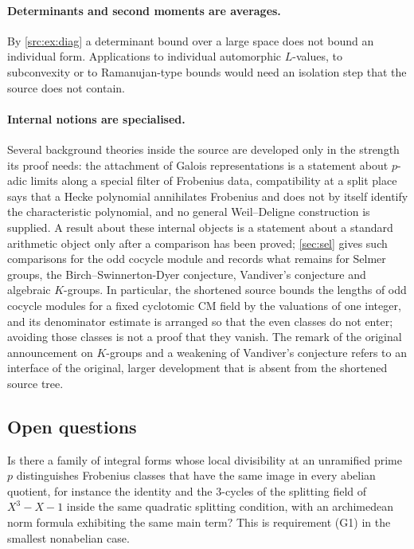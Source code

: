 \paragraph{Determinants and second moments are averages.}
By \cref{src:ex:diag} a determinant bound over a large space does not bound an individual
form. Applications to individual automorphic $L$-values, to subconvexity or to
Ramanujan-type bounds would need an isolation step that the source does not contain.

\paragraph{Internal notions are specialised.}
Several background theories inside the source are developed only in the strength its proof
needs: the attachment of Galois representations is a statement about $p$-adic limits along a
special filter of Frobenius data, compatibility at a split place says that a Hecke polynomial
annihilates Frobenius and does not by itself identify the characteristic polynomial, and no
general Weil--Deligne construction is supplied. A result about these internal objects is a
statement about a standard arithmetic object only after a comparison has been proved;
\cref{sec:sel} gives such comparisons for the odd cocycle module and records what remains
for Selmer groups, the Birch--Swinnerton-Dyer conjecture, Vandiver's conjecture and algebraic
$K$-groups. In particular, the shortened source bounds the lengths of odd cocycle modules for
a fixed cyclotomic CM field by the valuations of one integer, and its denominator estimate is
arranged so that the even classes do not enter; avoiding those classes is not a proof that
they vanish. The remark of the original announcement on $K$-groups and a weakening of
Vandiver's conjecture \cite[Step~17]{Alpoge2026Remark} refers to an interface of the original,
larger development that is absent from the shortened source tree.

\subsection{Open questions}\label{src:sec:open}
\begingroup\raggedright
{}
\endgroup

\begin{question}\label{src:q:divisibility}
Is there a family of integral forms whose local divisibility at an unramified prime $p$
distinguishes Frobenius classes that have the same image in every abelian quotient, for
instance the identity and the $3$-cycles of the splitting field of $X^3-X-1$ inside the same
quadratic splitting condition, with an archimedean norm formula exhibiting the same main term?
This is requirement (G1) in the smallest nonabelian case.
\end{question}

